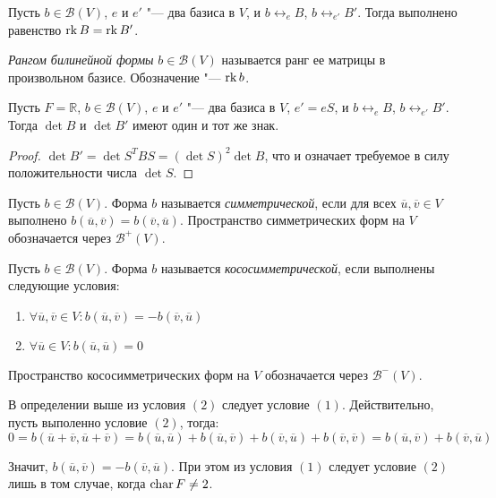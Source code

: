 \begin{corollary}
	Пусть $b \in \mathcal{B}(V)$, $e$ и $e'$ "--- два базиса в $V$, и $b \leftrightarrow_e B$, $b \leftrightarrow_{e'} B'$. Тогда выполнено равенство $\operatorname{rk}{B} = \operatorname{rk}{B'}$.
\end{corollary}

\begin{definition}
	\textit{Рангом билинейной формы} $b \in \mathcal{B}(V)$ называется ранг ее матрицы в произвольном базисе. Обозначение "--- $\operatorname{rk}{b}$.
\end{definition}

\begin{corollary}
	Пусть $F = \mathbb{R}$, $b \in \mathcal{B}(V)$, $e$ и $e'$ "--- два базиса в $V$, $e' = eS$, и $b \leftrightarrow_e B$, $b \leftrightarrow_{e'} B'$. Тогда $\det{B}$ и $\det{B'}$ имеют один и тот же знак.
\end{corollary}

\begin{proof}
	$\det{B'} = \det{S^TBS} = (\det{S})^2\det{B}$, что и означает требуемое в силу положительности числа $\det{S}$.
\end{proof}

\begin{definition}
	Пусть $b \in \mathcal{B}(V)$. Форма $b$ называется \textit{симметрической}, если для всех $\overline{u}, \overline{v} \in V$ выполнено $b(\overline{u}, \overline{v}) = b(\overline{v}, \overline{u})$. Пространство симметрических форм на $V$ обозначается через $\mathcal{B}^+(V)$.
\end{definition}

\begin{definition}
	Пусть $b \in \mathcal{B}(V)$. Форма $b$ называется \textit{кососимметрической}, если выполнены следующие условия:
	\begin{enumerate}
		\item $\forall \overline{u}, \overline{v} \in V: b(\overline{u}, \overline{v}) = -b(\overline{v}, \overline{u})$
		\item $\forall \overline{u} \in V: b(\overline{u}, \overline{u}) = 0$
	\end{enumerate}
	
	Пространство кососимметрических форм на $V$ обозначается через $\mathcal{B}^-(V)$.
\end{definition}

\begin{note}
	В определении выше из условия $(2)$ следует условие $(1)$. Действительно, пусть выполенно условие $(2)$, тогда:
	\[0 = b(\overline{u} + \overline{v}, \overline{u} + \overline{v}) = b(\overline{u}, \overline{u}) + b(\overline{u}, \overline{v}) + b(\overline{v}, \overline{u}) + b(\overline{v}, \overline{v}) = b(\overline{u}, \overline{v}) + b(\overline{v}, \overline{u})\]
	
	Значит, $b(\overline{u}, \overline{v}) = -b(\overline{v}, \overline{u})$. При этом из условия $(1)$ следует условие $(2)$ лишь в том случае, когда $\operatorname{char}{F} \ne 2$.
\end{note}

